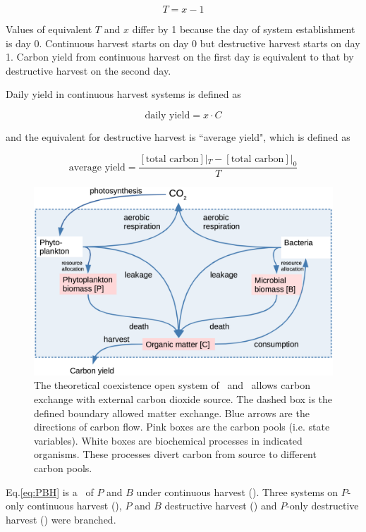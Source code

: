 \documentclass[../thesis.tex]{subfiles} %
\begin{document}
\begin{equation*}
    T = x-1
    \label{eq:TvsX}
\end{equation*}

Values of equivalent $T$ and $x$ differ by 1 because the day of system establishment is day 0.  Continuous harvest starts on day 0 but destructive harvest starts on day 1.  Carbon yield from continuous harvest on the first day is equivalent to that by destructive harvest on the second day.

Daily yield in continuous harvest systems is defined as

\begin{equation}
    \text{daily yield} = x\cdot C
    \label{eq:yield}
\end{equation}

and the equivalent for destructive harvest is ``average yield", which is defined as

\begin{equation*}
    \text{average yield} = \dfrac{[\text{total carbon}]|_{T}-[\text{total carbon}]|_{0}}{T}
    \label{eq:avgYd}
\end{equation*}

\begin{figure}[H]
    \centering
    \includegraphics[width=.8\linewidth]{media/model.png}
    \caption[Model visualization]{The theoretical coexistence open system of \phy\ and \bac\ allows carbon exchange with external carbon dioxide source.  The dashed box is the defined boundary allowed matter exchange.  Blue arrows are the directions of carbon flow.  Pink boxes are the carbon pools (i.e. state variables).  White boxes are biochemical processes in indicated organisms.  These processes divert carbon from source to different carbon pools.}
    \label{f:model}
\end{figure}

Eq.\ref{eq:PBH} is a \pbs\ of $P$ and $B$ under continuous harvest (\PBH).  Three systems on $P$-only continuous harvest (\PoH), $P$ and $B$ destructive harvest (\PBN) and $P$-only destructive harvest (\PoN) were branched.
\end{document}
